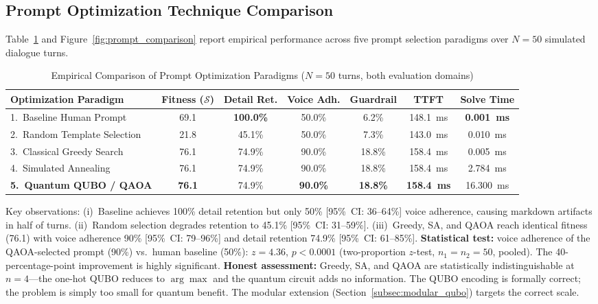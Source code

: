 \documentclass[11pt,a4paper]{article}
\begin{document}
\subsection{Prompt Optimization Technique Comparison}
\label{subsec:eval_prompts}

Table~\ref{tab:prompt_benchmarks} and Figure~\ref{fig:prompt_comparison} report empirical performance across five prompt selection paradigms over $N=50$ simulated dialogue turns.

\begin{table}[htbp]
\centering
\small
\caption{Empirical Comparison of Prompt Optimization Paradigms ($N=50$ turns, both evaluation domains)}
\label{tab:prompt_benchmarks}
\renewcommand{\arraystretch}{1.3}
\begin{tabularx}{\textwidth}{lcccccc}
\toprule
\textbf{Optimization Paradigm} & \textbf{Fitness ($\mathcal{S}$)} & \textbf{Detail Ret.} & \textbf{Voice Adh.} & \textbf{Guardrail} & \textbf{TTFT} & \textbf{Solve Time} \\
\midrule
1.\ Baseline Human Prompt & 69.1 & \textbf{100.0\%} & 50.0\% & 6.2\% & 148.1~ms & \textbf{0.001~ms} \\
2.\ Random Template Selection & 21.8 & 45.1\% & 50.0\% & 7.3\% & 143.0~ms & 0.010~ms \\
3.\ Classical Greedy Search & 76.1 & 74.9\% & 90.0\% & 18.8\% & 158.4~ms & 0.005~ms \\
4.\ Simulated Annealing & 76.1 & 74.9\% & 90.0\% & 18.8\% & 158.4~ms & 2.784~ms \\
\textbf{5.\ Quantum QUBO / QAOA} & \textbf{76.1} & 74.9\% & \textbf{90.0\%} & \textbf{18.8\%} & \textbf{158.4~ms} & 16.300~ms \\
\bottomrule
\end{tabularx}
\end{table}

Key observations: (i)~Baseline achieves 100\% detail retention but only 50\% [95\%~CI: 36--64\%] voice adherence, causing markdown artifacts in half of turns. (ii)~Random selection degrades retention to 45.1\% [95\%~CI: 31--59\%]. (iii)~Greedy, SA, and QAOA reach identical fitness (76.1) with voice adherence 90\% [95\%~CI: 79--96\%] and detail retention 74.9\% [95\%~CI: 61--85\%]. \textbf{Statistical test:} voice adherence of the QAOA-selected prompt (90\%) vs.\ human baseline (50\%): $z = 4.36$, $p < 0.0001$ (two-proportion $z$-test, $n_1=n_2=50$, pooled). The 40-percentage-point improvement is highly significant. \textbf{Honest assessment:} Greedy, SA, and QAOA are statistically indistinguishable at $n{=}4$---the one-hot QUBO reduces to $\arg\max$ and the quantum circuit adds no information. The QUBO encoding is formally correct; the problem is simply too small for quantum benefit. The modular extension (Section~\ref{subsec:modular_qubo}) targets the correct scale.
\end{document}
